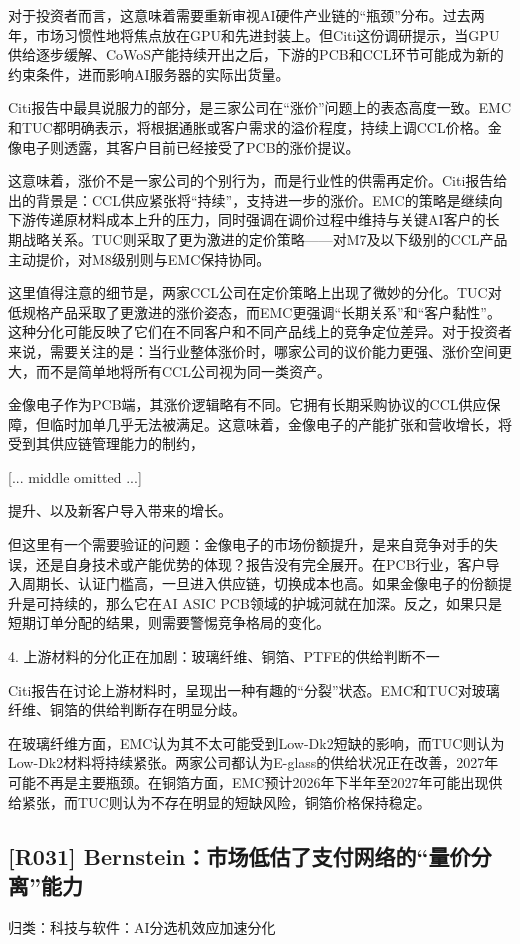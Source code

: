 \documentclass[11pt]{ctexart}
\begin{document}
对于投资者而言，这意味着需要重新审视AI硬件产业链的“瓶颈”分布。过去两年，市场习惯性地将焦点放在GPU和先进封装上。但Citi这份调研提示，当GPU供给逐步缓解、CoWoS产能持续开出之后，下游的PCB和CCL环节可能成为新的约束条件，进而影响AI服务器的实际出货量。

Citi报告中最具说服力的部分，是三家公司在“涨价”问题上的表态高度一致。EMC和TUC都明确表示，将根据通胀或客户需求的溢价程度，持续上调CCL价格。金像电子则透露，其客户目前已经接受了PCB的涨价提议。

这意味着，涨价不是一家公司的个别行为，而是行业性的供需再定价。Citi报告给出的背景是：CCL供应紧张将“持续”，支持进一步的涨价。EMC的策略是继续向下游传递原材料成本上升的压力，同时强调在调价过程中维持与关键AI客户的长期战略关系。TUC则采取了更为激进的定价策略——对M7及以下级别的CCL产品主动提价，对M8级别则与EMC保持协同。

这里值得注意的细节是，两家CCL公司在定价策略上出现了微妙的分化。TUC对低规格产品采取了更激进的涨价姿态，而EMC更强调“长期关系”和“客户黏性”。这种分化可能反映了它们在不同客户和不同产品线上的竞争定位差异。对于投资者来说，需要关注的是：当行业整体涨价时，哪家公司的议价能力更强、涨价空间更大，而不是简单地将所有CCL公司视为同一类资产。

金像电子作为PCB端，其涨价逻辑略有不同。它拥有长期采购协议的CCL供应保障，但临时加单几乎无法被满足。这意味着，金像电子的产能扩张和营收增长，将受到其供应链管理能力的制约，

[... middle omitted ...]

提升、以及新客户导入带来的增长。

但这里有一个需要验证的问题：金像电子的市场份额提升，是来自竞争对手的失误，还是自身技术或产能优势的体现？报告没有完全展开。在PCB行业，客户导入周期长、认证门槛高，一旦进入供应链，切换成本也高。如果金像电子的份额提升是可持续的，那么它在AI ASIC PCB领域的护城河就在加深。反之，如果只是短期订单分配的结果，则需要警惕竞争格局的变化。

4. 上游材料的分化正在加剧：玻璃纤维、铜箔、PTFE的供给判断不一

Citi报告在讨论上游材料时，呈现出一种有趣的“分裂”状态。EMC和TUC对玻璃纤维、铜箔的供给判断存在明显分歧。

在玻璃纤维方面，EMC认为其不太可能受到Low-Dk2短缺的影响，而TUC则认为Low-Dk2材料将持续紧张。两家公司都认为E-glass的供给状况正在改善，2027年可能不再是主要瓶颈。在铜箔方面，EMC预计2026年下半年至2027年可能出现供给紧张，而TUC则认为不存在明显的短缺风险，铜箔价格保持稳定。

\subsection{[R031] Bernstein：市场低估了支付网络的“量价分离”能力}
{\small\color{refgray}归类：科技与软件：AI分选机效应加速分化}
\end{document}

